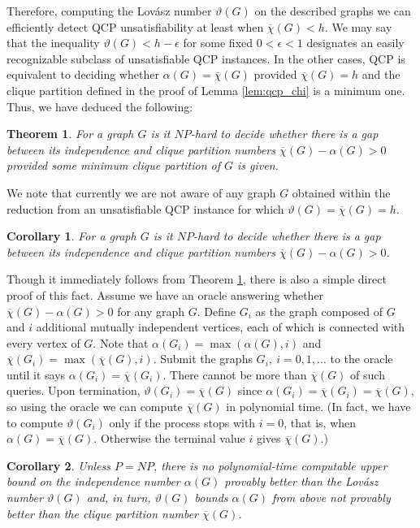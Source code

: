 \documentclass[11pt]{article}
\newtheorem{thm}{Theorem}
\newtheorem{cor}{Corollary}
\begin{document}
\vspace{1pc}

Therefore, computing the Lov\'asz number $\vartheta(G)$ on the described graphs 
we can efficiently detect QCP unsatisfiability at least when 
$\overline{\chi}(G)<h$. We may say that the inequality $\vartheta(G)<h-\epsilon$ 
for some fixed $0<\epsilon<1$ designates an easily recognizable subclass of 
unsatisfiable QCP instances.
In the other cases, QCP is equivalent to deciding whether 
$\alpha(G)=\overline{\chi}(G)$ provided $\overline{\chi}(G)=h$ and the clique 
partition defined in the proof of Lemma \ref{lem:qcp_chi} is a minimum one. 
Thus, we have deduced the following:
\begin{thm}
\label{thm:main}
For a graph $G$ is it $NP$-hard to decide whether there is a gap between its 
independence and clique partition numbers $\overline{\chi}(G)-\alpha(G)>0$ 
provided some minimum clique partition of $G$ is given.
\end{thm}

We note that currently we are not aware of any graph $G$ obtained within the 
reduction from an unsatisfiable QCP instance for which
$\vartheta(G)=\overline{\chi}(G)=h$.
\begin{cor}
For a graph $G$ is it $NP$-hard to decide whether there is a gap between its 
independence and clique partition numbers $\overline{\chi}(G)-\alpha(G)>0$.
\end{cor}

Though it immediately follows from Theorem \ref{thm:main}, there is also a 
simple direct proof of this fact. Assume we have an oracle answering whether 
$\overline{\chi}(G)-\alpha(G)>0$ for any graph $G$. Define $G_i$ as the graph 
composed of $G$ and $i$ additional mutually independent vertices, each of which 
is connected with every vertex of $G$. Note that $\alpha(G_i)=\max(\alpha(G),i)$ 
and $\overline{\chi}(G_i)=\max(\overline{\chi}(G),i)$. Submit the graphs
$G_i, \ i=0,1,\ldots$ to the oracle until it says $\alpha(G_i)=\overline{\chi}(G_i)$. 
There cannot be more than $\overline{\chi}(G)$ of such queries. Upon 
termination, $\vartheta(G_i)=\overline{\chi}(G)$ since
$\alpha(G_i)=\overline{\chi}(G_i)=\overline{\chi}(G)$, so using the oracle we
can compute $\overline{\chi}(G)$ in polynomial time. (In fact, we have to compute 
$\vartheta(G_i)$ only if the process stops with $i=0$, that is, when 
$\alpha(G)=\overline{\chi}(G)$. Otherwise the terminal value $i$ gives 
$\overline{\chi}(G)$.)

\begin{cor}
Unless $P=NP$, there is no polynomial-time computable upper bound on the 
independence number $\alpha(G)$ provably better than the Lov\'asz number 
$\vartheta(G)$ and, in turn, $\vartheta(G)$ bounds $\alpha(G)$ from above not 
provably better than the clique partition number $\overline{\chi}(G)$.
\end{cor}
\end{document}
